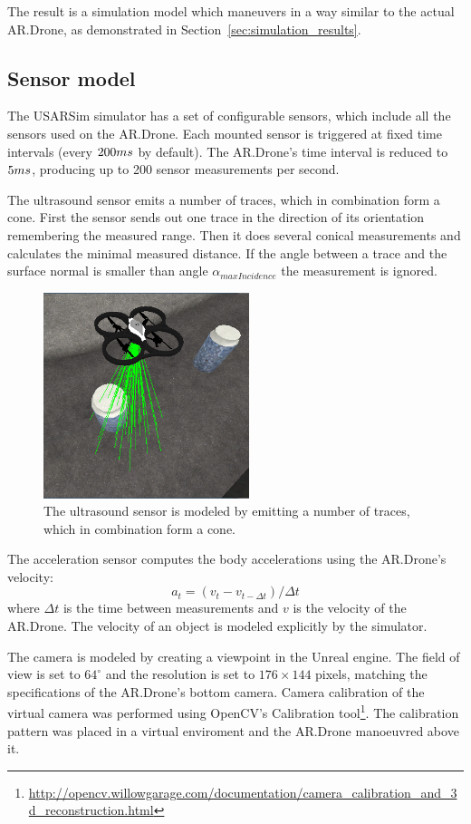 The result is a simulation model which maneuvers in a way similar to the actual AR.Drone, as demonstrated in Section~\ref{sec:simulation_results}.


		\subsection{Sensor model}
The USARSim simulator has a set of configurable sensors, which include all the sensors used on the AR.Drone.
Each mounted sensor is triggered at fixed time intervals (every $200\small{ms}$ by default).
The AR.Drone's time interval is reduced to $5\small{ms}$, producing up to 200 sensor measurements per second.

The ultrasound sensor emits a number of traces, which in combination form a cone.
First the sensor sends out one trace in the direction of its orientation remembering the measured range.
Then it does several conical measurements and calculates the minimal measured distance.
If the angle between a trace and the surface normal is smaller than angle $\alpha_{maxIncidence}$ the measurement is ignored.

\begin{figure}[htb!]
\centering
\includegraphics[width=6cm]{images/usarsim_sonar_beams.png}
\caption{The ultrasound sensor is modeled by emitting a number of traces, which in combination form a cone.} 
\label{fig:3Dmodel}
\end{figure}


The acceleration sensor computes the body accelerations using the AR.Drone's velocity:
\begin{equation}
a_{t} = (v_{t} - v_{t-\Delta t}) / \Delta t
\end{equation}
where $\Delta t$ is the time between measurements and $v$ is the velocity of the AR.Drone. The velocity of an object is modeled explicitly by the simulator.

The camera is modeled by creating a viewpoint in the Unreal engine.
The field of view is set to $64^\circ$ and the resolution is set to $176 \times 144$ pixels, matching the specifications of the AR.Drone's bottom camera.
Camera calibration of the virtual camera was performed using OpenCV's Calibration tool\footnote{\url{http://opencv.willowgarage.com/documentation/camera_calibration_and_3d_reconstruction.html}}.
The calibration pattern was placed in a virtual enviroment and the AR.Drone manoeuvred above it.

